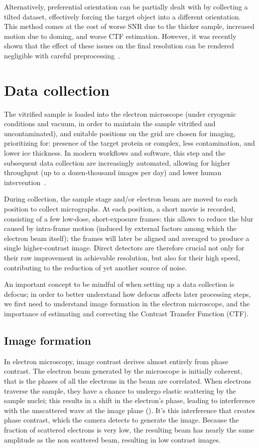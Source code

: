 Alternatively, preferential orientation can be partially dealt with by collecting a tilted dataset, effectively forcing the target object into a different orientation.
This method comes at the cost of worse SNR due to the thicker sample, increased motion due to doming, and worse CTF estimation.
However, it was recently shown that the effect of these issues on the final resolution can be rendered negligible with careful preprocessing~\cite{aiyerOvercomingResolutionAttenuation2024}.

\section{Data collection}
The vitrified sample is loaded into the electron microscope (under cryogenic conditions and vacuum, in order to maintain the sample vitrified and uncontaminated), and suitable positions on the grid are chosen for imaging, prioritizing for: presence of the target protein or complex, less contamination, and lower ice thickness.
In modern workflows and software, this step and the subsequent data collection are increasingly automated, allowing for higher throughput (up to a dozen-thousand images per day) and lower human intervention~\cite{schorbSoftwareToolsAutomated2019}.

During collection, the sample stage and/or electron beam are moved to each position to collect micrographs.
At each position, a short movie is recorded, consisting of a few low-dose, short-exposure frames: this allows to reduce the blur caused by intra-frame motion (induced by external factors among which the electron beam itself); the frames will later be aligned and averaged to produce a single higher-contrast image.
Direct detectors are therefore crucial not only for their raw improvement in achievable resolution, but also for their high speed, contributing to the reduction of yet another source of noise.

An important concept to be mindful of when setting up a data collection is defocus; in order to better understand how defocus affects later processing steps, we first need to understand image formation in the electron microscope, and the importance of estimating and correcting the Contrast Transfer Function (CTF).

\subsection{Image formation}

In electron microscopy, image contrast derives almost entirely from phase contrast.
The electron beam generated by the microscope is initially coherent, that is the phases of all the electrons in the beam are correlated.
When electrons traverse the sample, they have a chance to undergo elastic scattering by the sample nuclei; this results in a shift in the electron's phase, leading to interference with the unscattered wave at the image plane ().
It's this interference that creates phase contrast, which the camera detects to generate the image.
Because the fraction of scattered electrons is very low, the resulting beam has nearly the same amplitude as the non scattered beam, resulting in low contrast images.

